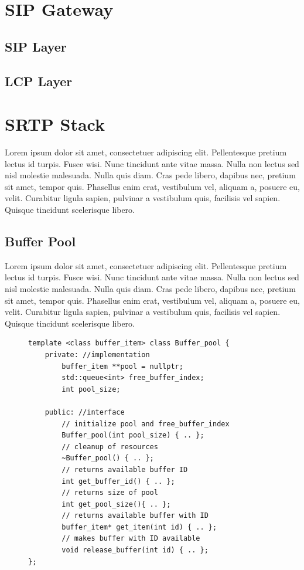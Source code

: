 
\section{SIP Gateway}
\subsection{SIP Layer}
\subsection{LCP Layer}


\section{SRTP Stack}
Lorem ipsum dolor sit amet, consectetuer adipiscing elit. Pellentesque pretium lectus id turpis. Fusce wisi. Nunc tincidunt ante vitae massa. Nulla non lectus sed nisl molestie malesuada. Nulla quis diam. Cras pede libero, dapibus nec, pretium sit amet, tempor quis. Phasellus enim erat, vestibulum vel, aliquam a, posuere eu, velit. Curabitur ligula sapien, pulvinar a vestibulum quis, facilisis vel sapien. Quisque tincidunt scelerisque libero.


\subsection{Buffer Pool}
Lorem ipsum dolor sit amet, consectetuer adipiscing elit. Pellentesque pretium lectus id turpis. Fusce wisi. Nunc tincidunt ante vitae massa. Nulla non lectus sed nisl molestie malesuada. Nulla quis diam. Cras pede libero, dapibus nec, pretium sit amet, tempor quis. Phasellus enim erat, vestibulum vel, aliquam a, posuere eu, velit. Curabitur ligula sapien, pulvinar a vestibulum quis, facilisis vel sapien. Quisque tincidunt scelerisque libero.

\begin{figure}[H]
\begin{lstlisting}
template <class buffer_item> class Buffer_pool {
    private: //implementation
        buffer_item **pool = nullptr;
        std::queue<int> free_buffer_index;
        int pool_size;

    public: //interface
        // initialize pool and free_buffer_index
        Buffer_pool(int pool_size) { .. };
        // cleanup of resources
        ~Buffer_pool() { .. };
        // returns available buffer ID
        int get_buffer_id() { .. };
        // returns size of pool
        int get_pool_size(){ .. };
        // returns available buffer with ID
        buffer_item* get_item(int id) { .. };
        // makes buffer with ID available
        void release_buffer(int id) { .. };
};
\end{lstlisting}
\end{figure}

